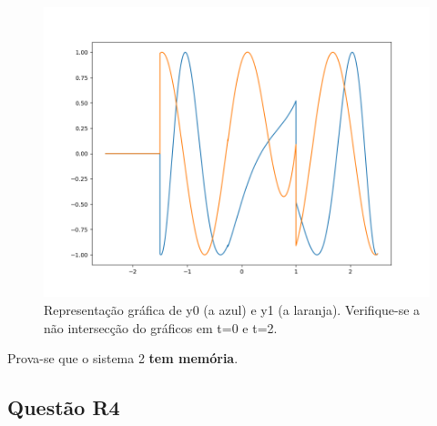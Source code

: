 \documentclass[a4paper,12pt]{article}
\begin{document}
			\begin{figure}[H]
       	 			\centering
        			\captionsetup{justification=centering}
        			\includegraphics[scale=0.35\textscale]{r3graph02.png}
				\caption{Representação gráfica de y0 (a azul) e y1 (a laranja). Verifique-se a não intersecção do gráficos em t=0 e t=2.}
			\end{figure}
			Prova-se que o sistema 2 \textbf{tem memória}.
		\newpage
		\subsection{Questão R4}
\end{document}
